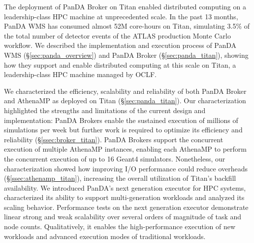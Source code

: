 
The deployment of PanDA Broker on Titan enabled distributed computing on a
leadership-class HPC machine at unprecedented scale. In the past 13 months,
PanDA WMS has consumed almost 52M core-hours on Titan, simulating 3.5\% of
the total number of detector events of the ATLAS production Monte Carlo
workflow. We described the implementation and execution process of PanDA WMS
(\S\ref{sec:panda_overview}) and PanDA Broker (\S\ref{sec:panda_titan}),
showing how they support and enable distributed computing at this scale on
Titan, a leadership-class HPC machine managed by OCLF.

We characterized the efficiency, scalability and reliability of both PanDA
Broker and AthenaMP as deployed on Titan (\S\ref{sec:panda_titan}). Our
characterization highlighted the strengths and limitations of the current
design and implementation: PanDA Brokers enable the sustained execution of
millions of simulations per week but further work is required to optimize its
efficiency and reliability (\S\ref{ssec:broker_titan}). PanDA Brokers support
the concurrent execution of multiple AthenaMP instances, enabling each
AthenaMP to perform the concurrent execution of up to 16 Geant4 simulators.
Nonetheless, our characterization showed how improving I/O performance could
reduce overheads (\S\ref{ssec:athenamp_titan}), increasing the overall
utilization of Titan's backfill availability. We introduced PanDA's next
generation executor for HPC systems, characterized its ability to support
multi-generation workloads and analyzed its scaling behavior.  Performance
tests on the next generation executor demonstrate linear strong and weak
scalability over several orders of magnitude  of task and node counts.
Qualitatively, it enables the high-performance execution of new workloads and
advanced execution modes of traditional workloads.

